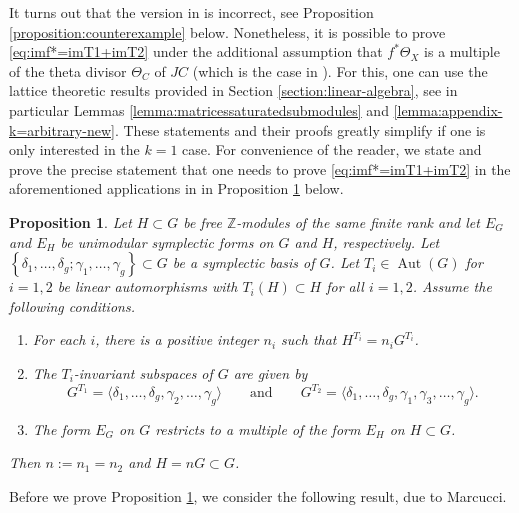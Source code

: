 \documentclass[a4paper,11pt,reqno]{amsart}
\numberwithin{equation}{section}
\theoremstyle{plain}
\newtheorem{proposition}[theorem]{Proposition}
\theoremstyle{definition}
\newcommand{\Z}{\mathbb Z}
\newcommand{\Aut}{\operatorname{Aut}}
\newcommand{\set}[1]{\left\{ #1 \right\}}
\begin{document}
It turns out that the version in \cite[Proposition 3.6]{marcucci-genusofcurves}
is incorrect, see Proposition \ref{proposition:counterexample} below. 
Nonetheless, it is possible to prove \eqref{eq:imf*=imT1+imT2} under the additional assumption that $f^\ast\Theta_{X}$ is a multiple of the theta divisor $\Theta_{C}$ of $JC$ (which is the case in \cite{bardellipirola-curvesofgenusg, naranjopirola2018}). 
For this, one can use the lattice theoretic results provided in Section \ref{section:linear-algebra}, see in particular Lemmas \ref{lemma:matricessaturatedsubmodules} and \ref{lemma:appendix-k=arbitrary-new}. 
These statements and their proofs greatly simplify if one is only interested in the $k=1$ case.  
For convenience of the reader, we state and prove the precise statement that one needs to prove \eqref{eq:imf*=imT1+imT2}  in the aforementioned applications in \cite{bardellipirola-curvesofgenusg,naranjopirola2018}
in Proposition \ref{proposition:marcucci:improved} below.

\begin{proposition} \label{proposition:marcucci:improved}
Let $H\subset G$ be free $\Z$-modules of the same finite rank and let $E_G$ and $E_H$ be unimodular symplectic forms on $G$ and $H$, respectively. 
Let $\set{\delta_1,\dotsc, \delta_g; \gamma_1,\dotsc, \gamma_g} \subset G$ be a symplectic basis of $G$.
Let $T_i\in \Aut(G)$ for $i=1,2$ be linear automorphisms with $T_i(H)\subset H$ for all $i=1,2$. 
Assume the following conditions. 
\begin{enumerate}[label=(\roman*)]
\item
\label{item:marcucci:improved:A}
For each $i$, there is a positive integer $n_i$ such that $H^{T_i}=n_iG^{T_i}$. 
    \item \label{item:marcucci:improved:B} 
    The $T_i$-invariant subspaces of $G$ are given by 
    $$
G^{T_1}=\langle\delta_1,\dots ,\delta_g,\gamma_2,\dots ,\gamma_g \rangle \quad \quad \text{and} \quad \quad G^{T_2}=\langle\delta_1,\dots ,\delta_g,\gamma_1,\gamma_3,\dots ,\gamma_g \rangle.
    $$
 \item \label{item:marcucci:improved:C} The form $E_G$ on $G$ restricts to a multiple of the form $E_H$ on $H\subset G$.
\end{enumerate}
Then $n:=n_1=n_2$ and $H = nG \subset G$. 
\end{proposition}

Before we prove Proposition \ref{proposition:marcucci:improved}, we consider the following result, due to Marcucci.  
\end{document}
